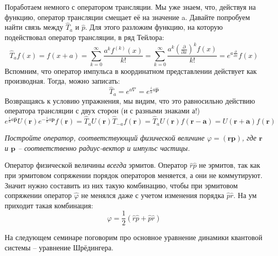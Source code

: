 Поработаем немного с оператором трансляции. Мы уже знаем, что, действуя на функцию, оператор трансляции смещает её на значение a. Давайте попробуем найти связь между $\hat T_{a}$ и $\hat{p}$. Для этого разложим функцию, на которую подействовал оператор трансляции, в ряд Тейлора:
\[
\hat T_{a} f(x) = f(x + a) = \sum\limits_{k=0}^{\infty} \frac{a^k f^{(k)}(x)}{k!} = \sum\limits_{k=0}^{\infty} \frac{a^k (\frac{\partial}{\partial x})^k f(x)}{k!} = e^{a \frac{\partial}{\partial x}} f(x)
\]
Вспомним, что оператор импульса в координатном представлении действует как производная. Тогда, можно записать:
\[
\hat T_{a} = e^{a\nabla} = e^{\frac{i}{h}a\hat{\mathbf{p}}}
\]
Возвращаясь к условию упражнения, мы видим, что это равносильно действию оператора трансляции с двух сторон (и с разными знаками а!)
\[
e^{\frac{i}{\hbar} a \hat{\mathbf{p}}} U(\mathbf{r}) e^{-\frac{i}{\hbar} a \hat{\mathbf{p}}} f(\mathbf{r}) = \hat T_{a} U(\mathbf{r}) \hat T_{-a} f(\mathbf{r}) = \hat T_{a}U(\mathbf{r}) f(\mathbf{r - a}) = U(\mathbf{r + a}) f(\mathbf{r})
\]
\begin{center}
\textit{Постройте оператор, соответствующий физической величине $\varphi = (\mathbf{rp})$, где $\mathbf r$ и $\mathbf p$ -- соответственно радиус-вектор и импульс частицы.}
\end{center}

Оператор физической величины \textit{всегда} эрмитов. Оператор $\hat{r}\hat{p}$ не эрмитов, так как при эрмитовом сопряжении порядок операторов меняется, а они не коммутируют. Значит нужно составить из них такую комбинацию, чтобы при эрмитовом сопряжении оператор $\hat{\varphi}$ не менялся даже с учетом изменения порядка $\hat{p} \hat{r}$. На ум приходит такая комбинация:
\[
\hat{\varphi} = \frac{1}{2} (\hat{r} \hat{p} + \hat{p} \hat{r})
\]

На следующем семинаре поговорим про основное уравнение динамики квантовой системы -- уравнение Шрёдингера.